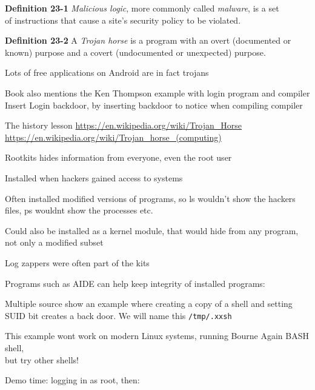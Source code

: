 \documentclass[Screen16to9,17pt]{foils}
\begin{document}

\begin{list1}
\item {\bf Definition 23-1} \emph{Malicious logic}, more commonly called \emph{malware}, is a set\\
 of instructions that cause a site's security policy to be violated.
\item {\bf Definition 23-2} A \emph{Trojan horse} is a program with an overt (documented or\\
known) purpose and a covert (undocumented or unexpected) purpose.

\item Lots of free applications on Android are in fact trojans

\item Book also mentions the Ken Thompson example with login program and compiler\\Insert Login backdoor, by inserting backdoor to notice when compiling compiler \smiley
\end{list1}

The history lesson
\url{https://en.wikipedia.org/wiki/Trojan_Horse}\\
\url{https://en.wikipedia.org/wiki/Trojan_horse_(computing)}



\begin{list1}
\item Rootkits hides information from everyone, even the root user
\item Installed when hackers gained access to systems
\item Often installed modified versions of programs, so ls wouldn't show the hackers files, ps wouldnt show the processes etc.
\item Could also be installed as a kernel module, that would hide from any program, not only a modified subset
\item Log zappers were often part of the kits
\item Programs such as AIDE can help keep integrity of installed programs:\\
\end{list1}




\begin{list1}
\item Multiple source show an example where creating a copy of a shell and setting SUID bit creates a back door. We will name this \verb+/tmp/.xxsh+
\item This example wont work on modern Linux systems, running Bourne Again BASH shell, \\but try other shells!
\item Demo time: logging in as root, then:
\end{list1}
\end{document}
